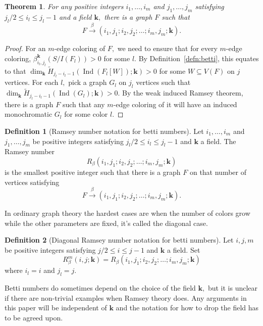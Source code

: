 \documentclass{article}
\theoremstyle{plain}
\newtheorem{thm}{Theorem}
\theoremstyle{definition}
\newtheorem{defn}{Definition}
\begin{document}
\begin{thm}\label{thm:arrowsExist}
For any positive integers $i_1,\ldots,i_m$ and $j_1,\ldots, j_m$ satisfying $j_l/2 \leq i_l \leq j_l-1$ and a field $\mathbf{k},$ there is a graph $F$ such that
\[ F \xrightarrow{\beta} (i_1,j_1;i_2,j_2;\ldots;i_m,j_m; \mathbf{k}). \]
\end{thm}
\begin{proof}
For an $m$-edge coloring of $F,$ we need to ensure that for every $m$-edge coloring, $\beta_{i_l,j_l}^{\mathbf{k}}(S/I(F_l))>0$ for some $l.$ By Definition~\ref{defn:betti}, this equates to that
$\dim_{\mathbf{k}} \widetilde{H}_{j_l - i_l - 1}(\operatorname{Ind}(F_l[W]); \mathbf{k})>0$ for some $W \subseteq V(F)$ on $j$ vertices. For each $l,$ pick a graph $G_l$ on $j_l$ vertices such that
$\dim_{\mathbf{k}} \widetilde{H}_{j_l - i_l - 1}(\operatorname{Ind}(G_l); \mathbf{k})>0.$ By the weak induced Ramsey theorem, there is a graph $F$ such that any $m$-edge coloring of it will have an induced monochromatic $G_l$ for some color $l.$
\end{proof}

\begin{defn}[Ramsey number notation for betti numbers] Let $i_1,\ldots,i_m$ and $j_1,\ldots, j_m$ be positive integers satisfying $j_l/2 \leq i_l \leq j_l-1$ and $\mathbf{k}$ a field. The Ramsey number
\[ R_\beta (i_1,j_1;i_2,j_2;\ldots;i_m,j_m; \mathbf{k}) \]
is the smallest positive integer such that there is a graph $F$ on that number of vertices satisfying
\[ F \xrightarrow{\beta} (i_1,j_1;i_2,j_2;\ldots;i_m,j_m; \mathbf{k}). \]
\end{defn}

In ordinary graph theory the hardest cases are when the number of colors grow while the other parameters are fixed, it's called the diagonal case.

\begin{defn}[Diagonal Ramsey number notation for betti numbers] Let $i,j,m$ be positive integers satisfying $j/2 \leq i \leq j-1$ and $\mathbf{k}$ a field. Set
\[ R_\beta^m (i,j; \mathbf{k}) = R_\beta (i_1,j_1;i_2,j_2;\ldots;i_m,j_m; \mathbf{k}) \]
where $i_l = i$ and $j_l = j.$
\end{defn}

Betti numbers do sometimes depend on the choice of the field $\mathbf{k},$ but it is unclear if there are non-trivial examples when Ramsey theory does. Any arguments in this paper will be independent of $\mathbf{k}$ and the notation for how to drop the field has to be agreed upon.
\end{document}
